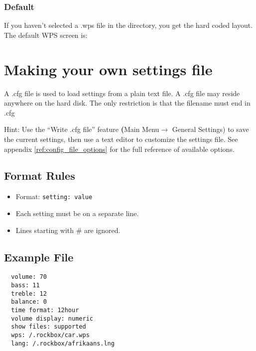 \subsubsection{Default}
If you haven't selected a .wps file in the  directory, you get
the hard coded layout. The default WPS screen is:


\section{\label{ref:SettingsFile}Making your own settings file}
A .cfg file is used to load settings from a plain text file. A .cfg file may
reside anywhere on the hard disk. The only restriction is that the filename
must end in .cfg

Hint: Use the ``Write .cfg file'' feature \textbf({Main Menu$\rightarrow$
General Settings}) to save the current settings, then use a text editor to
customize the settings file. See appendix \ref{ref:config_file_options} 
for the full reference of available options.

\subsection{Format Rules}

\begin{itemize}
\item Format: \verb+setting: value+
\item Each setting must be on a separate line.
\item Lines starting with \# are ignored.
\end{itemize}

\subsection{Example File}
\begin{verbatim}
  volume: 70
  bass: 11
  treble: 12
  balance: 0
  time format: 12hour
  volume display: numeric
  show files: supported
  wps: /.rockbox/car.wps
  lang: /.rockbox/afrikaans.lng
\end{verbatim}

